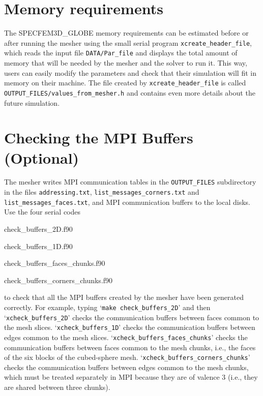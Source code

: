 \documentclass[oneside,english]{book}
\newenvironment{lyxcode}
{\begin{list}{}{
\setlength{\rightmargin}{\leftmargin}
\setlength{\listparindent}{0pt}%
\raggedright
\setlength{\itemsep}{0pt}
\setlength{\parsep}{0pt}
\normalfont\ttfamily}%
 \item[]}
{\end{list}}
\begin{document}
\section{Memory requirements}

The SPECFEM3D\_GLOBE memory requirements can be estimated before or
after running the mesher using the small serial program \texttt{\small xcreate\_header\_file},
which reads the input file \texttt{\small DATA/Par\_file} and displays
the total amount of memory that will be needed by the mesher and the
solver to run it. This way, users can easily modify the parameters
and check that their simulation will fit in memory on their machine.
The file created by \texttt{\small xcreate\_header\_file} is called
\texttt{OUTPUT\_FILES/values\_from\_mesher.h} and contains even more
details about the future simulation.


\section{Checking the MPI Buffers (Optional)}

The mesher writes MPI communication tables in the \texttt{OUTPUT\_FILES}
subdirectory in the files \texttt{addressing.txt}, \texttt{list\_messages\_corners.txt}
and \texttt{list\_messages\_faces.txt}, and MPI communication buffers
to the local disks. Use the four serial codes

\begin{lyxcode}
check\_buffers\_2D.f90

check\_buffers\_1D.f90

check\_buffers\_faces\_chunks.f90

check\_buffers\_corners\_chunks.f90~
\end{lyxcode}
to check that all the MPI buffers created by the mesher have been
generated correctly. For example, typing `\texttt{make check\_buffers\_2D}'
and then `\texttt{xcheck\_buffers\_2D}' checks the communication buffers
between faces common to the mesh slices. `\texttt{xcheck\_buffers\_1D}'
checks the communication buffers between edges common to the mesh
slices. `\texttt{xcheck\_buffers\_faces\_chunks}' checks the communication
buffers between faces common to the mesh chunks, i.e., the faces of
the six blocks of the cubed-sphere mesh. `\texttt{xcheck\_buffers\_corners\_chunks}'
checks the communication buffers between edges common to the mesh
chunks, which must be treated separately in MPI because they are of
valence 3 (i.e., they are shared between three chunks).
\end{document}
